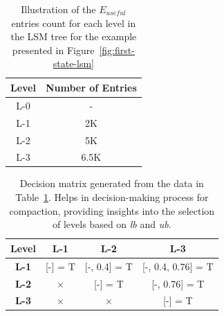\begin{table}
    \begin{tabular}{|c|c|}
        \hline
        \textbf{Level} & \textbf{Number of Entries} \\
        \hline
        L-0 & \-- \\
        \hline
        L-1 & 2K \\
        \hline
        L-2 & 5K \\
        \hline
        L-3 & 6.5K \\
        \hline
    \end{tabular}
    \caption{Illustration of the \textit{$E_{useful}$} entries count for each level in the LSM tree for
    the example presented in Figure~\ref{fig:first-state-lsm}}
    \label{table:ex-decision-making-meta-data}
\end{table}

\begin{table}
    \begin{tabular}{ |c|c|c|c| }
        \hline
        \textbf{Level} & \textbf{L-1} & \hspace*{4.1mm}\textbf{L-2}\hspace*{4.1mm} & \hspace*{4.1mm}\textbf{L-3}\hspace*{4.1mm} \\
        \hline
        \textbf{L-1} & [-] = T & [-, 0.4] = T & [-, 0.4, 0.76] = T \\
        \hline
        \textbf{L-2} & $\times$ & [-] = T & [-, 0.76] = T \\
        \hline
        \textbf{L-3} &  $\times$ &  $\times$ & [-] = T \\
        \hline
    \end{tabular}
    \caption{Decision matrix generated from the data in Table~\ref{table:ex-decision-making-meta-data}. Helps in 
    decision-making process for compaction, providing insights into the selection of levels based on \textit{lb} and \textit{ub}.}
    \label{table:ex-decision-matrix}
\end{table}

